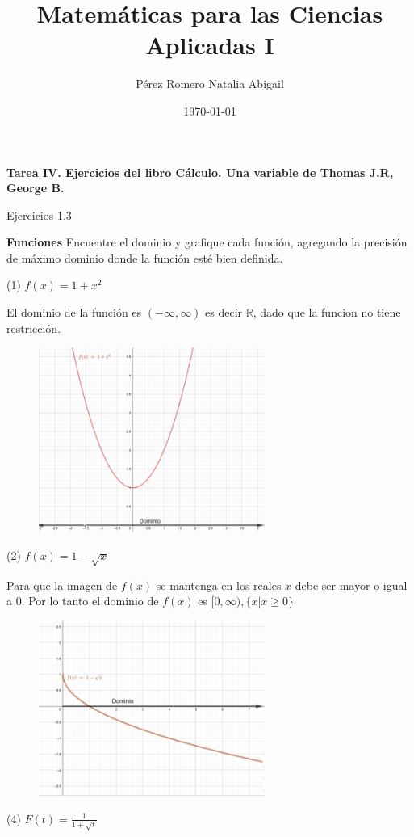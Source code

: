 \documentclass[12pt, letterpaper]{article}
\title{Matemáticas para las Ciencias Aplicadas I}
\author{Pérez Romero Natalia Abigail}
\date{\today}
\begin{document}
\maketitle
\textbf{Tarea IV. Ejercicios del libro Cálculo. Una variable de Thomas J.R, George B.}

Ejercicios 1.3

\textbf{Funciones}
Encuentre el dominio y grafique cada función, agregando la precisión de máximo dominio donde la función esté bien definida.

(1) $f(x) = 1 + x^2$

El dominio de la función es $(-\infty , \infty)$ es decir  $\mathbb{R}$, dado que la funcion no tiene restricción.
\begin{figure}[h]
\centering
\includegraphics[width=20em]{uno}
\end{figure} 

\newpage
(2) $f(x) = 1 - \sqrt{x}$

Para que la imagen de $f(x)$ se mantenga en los reales $x$ debe ser mayor o igual a 0. Por lo tanto el dominio de $f(x)$ es $[0, \infty), \{x|x\geq 0\}$
\begin{figure}[h]
\centering
\includegraphics[width=20em]{dos}
\end{figure} 

(4) $F(t) = \frac{1}{1 + \sqrt{t}}$
\end{document}
